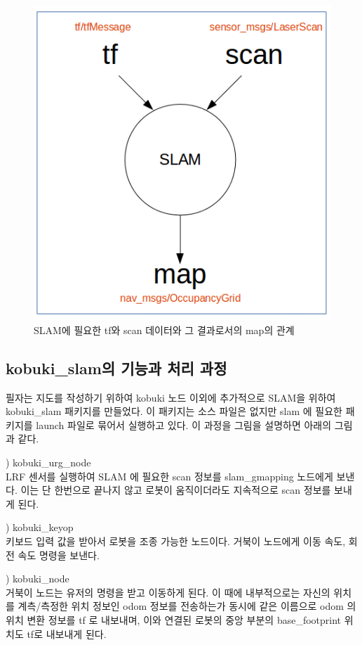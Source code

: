 \begin{figure}[h]
\centering
\includegraphics[width=0.6\columnwidth]{pictures/chapter11/tf_scan_slam_map.png}
\caption{SLAM에 필요한 tf와 scan 데이터와 그 결과로서의 map의 관계}
\end{figure}

\subsection{kobuki\_slam의 기능과 처리 과정}

필자는 지도를 작성하기 위하여 kobuki 노드 이외에 추가적으로 SLAM을 위하여 kobuki\_slam 패키지를 만들었다. 이 패키지는 소스 파일은 없지만 slam 에 필요한 패키지를 launch 파일로 묶어서 실행하고 있다. 이 과정을 그림을 설명하면 아래의 그림과 같다.  

\setcounter{num}{0}

\vspace{\baselineskip}
\noindent
{}
\thenum) kobuki\_urg\_node\\
LRF 센서를 실행하여 SLAM 에 필요한 scan 정보를 slam\_gmapping 노드에게 보낸다. 이는 단 한번으로 끝나지 않고 로봇이 움직이더라도 지속적으로 scan 정보를 보내게 된다.

\vspace{\baselineskip}
\noindent
{}
\thenum) kobuki\_keyop\\
키보드 입력 값을 받아서 로봇을 조종 가능한 노드이다. 거북이 노드에게 이동 속도, 회전 속도 명령을 보낸다.

\vspace{\baselineskip}
\noindent
{}
\thenum) kobuki\_node\\
거북이 노드는 유저의 명령을 받고 이동하게 된다. 이 때에 내부적으로는 자신의 위치를 계측/측정한 위치 정보인 odom 정보를 전송하는가 동시에 같은 이름으로 odom 의 위치 변환 정보를 tf 로 내보내며, 이와 연결된 로봇의 중앙 부분의 base\_footprint 위치도 tf로 내보내게 된다.

